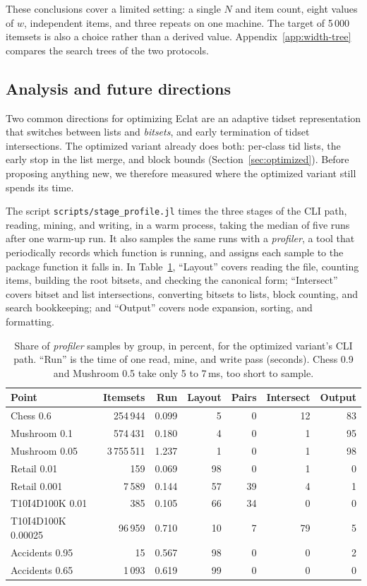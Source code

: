 These conclusions cover a limited setting: a single $N$ and item count, eight values of
$w$, independent items, and three repeats on one machine. The target of 5\,000 itemsets
is also a choice rather than a derived value. Appendix~\ref{app:width-tree} compares the
search trees of the two protocols.

\subsection{Analysis and future directions}
\label{sec:future}
Two common directions for optimizing Eclat are an adaptive tidset
representation that switches between lists and \emph{bitsets}, and early termination of
tidset intersections. The optimized variant already does both: per-class tid lists, the
early stop in the list merge, and block bounds (Section~\ref{sec:optimized}). Before
proposing anything new, we therefore measured where the optimized variant still
spends its time.

The script \texttt{scripts/stage\_profile.jl} times the three stages of the CLI path,
reading, mining, and writing, in a warm process, taking the median of five runs after one
warm-up run. It also samples the same runs with a \emph{profiler}, a tool that
periodically records which function is running, and assigns each sample to the package
function it falls in. In Table~\ref{tab:stage-profile}, ``Layout'' covers reading the
file, counting items, building the root bitsets, and checking the canonical form;
``Intersect'' covers bitset and list intersections, converting bitsets to lists, block
counting, and search bookkeeping; and ``Output'' covers node expansion, sorting, and
formatting.

\begin{table}[t]
\centering
\footnotesize
\setlength{\tabcolsep}{1.5pt}
\caption{Share of \emph{profiler} samples by group, in percent, for the optimized
variant's CLI path. ``Run'' is the time of one read, mine, and write pass (seconds).
Chess 0.9 and Mushroom 0.5 take only 5 to 7\,ms, too short to sample.}
\label{tab:stage-profile}
\begin{tabular}{lrrrrrr}
\hline
Point & Itemsets & Run & Layout & Pairs & Intersect & Output \\
\hline
Chess 0.6 & 254\,944 & 0.099 & 5 & 0 & 12 & 83 \\
Mushroom 0.1 & 574\,431 & 0.180 & 4 & 0 & 1 & 95 \\
Mushroom 0.05 & 3\,755\,511 & 1.237 & 1 & 0 & 1 & 98 \\
Retail 0.01 & 159 & 0.069 & 98 & 0 & 1 & 0 \\
Retail 0.001 & 7\,589 & 0.144 & 57 & 39 & 4 & 1 \\
T10I4D100K 0.01 & 385 & 0.105 & 66 & 34 & 0 & 0 \\
T10I4D100K 0.00025 & 96\,959 & 0.710 & 10 & 7 & 79 & 5 \\
Accidents 0.95 & 15 & 0.567 & 98 & 0 & 0 & 2 \\
Accidents 0.65 & 1\,093 & 0.619 & 99 & 0 & 0 & 0 \\
\hline
\end{tabular}
\end{table}

